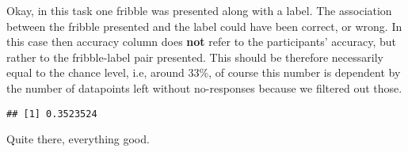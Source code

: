 \documentclass[
]{article}
\newenvironment{Shaded}{\begin{snugshade}}{\end{snugshade}}
\newcommand{\DataTypeTok}[1]{\textcolor[rgb]{0.13,0.29,0.53}{#1}}
\newcommand{\DecValTok}[1]{\textcolor[rgb]{0.00,0.00,0.81}{#1}}
\newcommand{\FloatTok}[1]{\textcolor[rgb]{0.00,0.00,0.81}{#1}}
\newcommand{\KeywordTok}[1]{\textcolor[rgb]{0.13,0.29,0.53}{\textbf{#1}}}
\newcommand{\NormalTok}[1]{#1}
\newcommand{\OperatorTok}[1]{\textcolor[rgb]{0.81,0.36,0.00}{\textbf{#1}}}
\newcommand{\StringTok}[1]{\textcolor[rgb]{0.31,0.60,0.02}{#1}}
\begin{document}
Okay, in this task one fribble was presented along with a label. The
association between the fribble presented and the label could have been
correct, or wrong. In this case then accuracy column does \textbf{not}
refer to the participants' accuracy, but rather to the fribble-label
pair presented. This should be therefore necessarily equal to the chance
level, i.e, around 33\%, of course this number is dependent by the
number of datapoints left without no-responses because we filtered out
those.

\begin{Shaded}
\end{Shaded}

\begin{Shaded}
\end{Shaded}

\begin{verbatim}
## [1] 0.3523524
\end{verbatim}

Quite there, everything good.

\begin{Shaded}
\end{Shaded}
\end{document}
